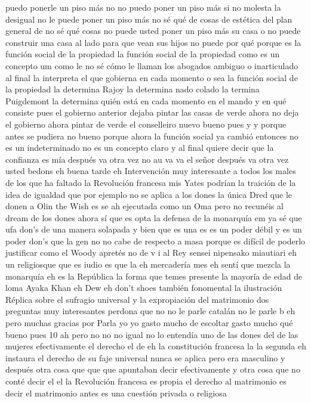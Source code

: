 puedo ponerle un piso más no no puedo poner un piso más si no molesta la desigual no le puede poner un piso más no sé qué de cosas de estética
del plan general de no sé qué cosas no puede usted poner un piso más su casa o no puede construir una casa al lado para que vean sus hijos
no puede por qué porque es la función social de la propiedad la función social de la propiedad como es un concepto um como le no sé cómo le llaman los abogados
ambiguo o inarticulado al final la interpreta el que gobierna en cada momento
o sea la función social de la propiedad la determina Rajoy la determina nado colado la termina Puigdemont la determina
quién está en cada momento en el mando y en qué consiste pues el gobierno anterior dejaba pintar las casas de verde ahora no deja
el gobierno ahora pintar de verde el conselleiro nuevo bueno pues y y porque antes se pudiera no
bueno porque ahora la función social ya cambió entonces no es un indeterminado no es un concepto claro
y al final quiere decir que la confianza es mía después va otra vez no au va
va el señor después va otra vez usted bedons eh buena tarde eh
Intervención
muy interesante a todos los males de los que ha faltado la Revolución francesa mis Yates podrían
la traición de la idea de igualdad que por ejemplo no se aplica a los dones la única Dred que le donen a Olin the Wish es
se ah ejecutada como un Oma pero no recunéis al dream de los dones ahora sí que es opta la defensa de la monarquía em
ya sé que ufa don's de una manera solapada y bien que es una es es un poder débil y es un poder don's que la gen no
no cabe de respecto a masa porque es difícil de poderlo justificar como el Woody apretés no de v i al Rey sensei nipensako miautiari
eh un religiosque que es iudio es que la eh mercadería mes eh sentí que mezcla la monarquía eh es la República
la forma que temes presente la mayoría de edad de loma Ayaka Khan eh Dew
eh don't shoes también fonomental la ilustración
Réplica sobre el sufragio universal y la expropiación del matrimonio
dos preguntas muy interesantes perdona que no no le parle catalán no le parle b eh pero muchas gracias por Parla
yo yo gasto mucho de escoltar gasto mucho qué bueno pues 10 ah pero no no no igual no lo entendía
uno de las dones del de las mujeres efectivamente el derecho el de eh
la constitución francesa la la segunda eh instaura el derecho de su faje universal nunca se aplica pero era masculino
y después otra cosa que que que apuntaban decir efectivamente y otra cosa que no conté decir el
el la Revolución francesa es propia el derecho al matrimonio es decir el matrimonio antes es una cuestión privada o religiosa
